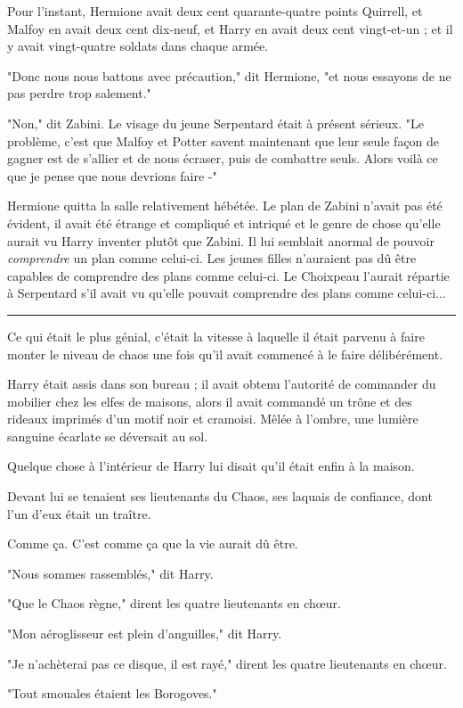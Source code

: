 Pour l'instant, Hermione avait deux cent quarante-quatre points Quirrell, et Malfoy en avait deux cent dix-neuf, et Harry en avait deux cent vingt-et-un ; et il y avait vingt-quatre soldats dans chaque armée.

"Donc nous nous battons avec précaution," dit Hermione, "et nous essayons de ne pas perdre trop salement."

"Non," dit Zabini. Le visage du jeune Serpentard était à présent sérieux. "Le problème, c'est que Malfoy et Potter savent maintenant que leur seule façon de gagner est de s'allier et de nous écraser, puis de combattre seuls. Alors voilà ce que je pense que nous devrions faire -"

Hermione quitta la salle relativement hébétée. Le plan de Zabini n'avait pas été évident, il avait été étrange et compliqué et intriqué et le genre de chose qu'elle aurait vu Harry inventer plutôt que Zabini. Il lui semblait anormal de pouvoir \emph{comprendre } un plan comme celui-ci. Les jeunes filles n'auraient pas dû être capables de comprendre des plans comme celui-ci. Le Choixpeau l'aurait répartie à Serpentard s'il avait vu qu'elle pouvait comprendre des plans comme celui-ci...
\par\noindent\rule{\textwidth}{0.4pt}
Ce qui était le plus génial, c'était la vitesse à laquelle il était parvenu à faire monter le niveau de chaos une fois qu'il avait commencé à le faire délibérément.

Harry était assis dans son bureau ; il avait obtenu l'autorité de commander du mobilier chez les elfes de maisons, alors il avait commandé un trône et des rideaux imprimés d'un motif noir et cramoisi. Mêlée à l'ombre, une lumière sanguine écarlate se déversait au sol.

Quelque chose à l'intérieur de Harry lui disait qu'il était enfin à la maison.

Devant lui se tenaient ses lieutenants du Chaos, ses laquais de confiance, dont l'un d'eux était un traître.

Comme ça. C'est comme ça que la vie aurait dû être.

"Nous sommes rassemblés," dit Harry.

"Que le Chaos règne," dirent les quatre lieutenants en chœur.

"Mon aéroglisseur est plein d'anguilles," dit Harry.

"Je n'achèterai pas ce disque, il est rayé," dirent les quatre lieutenants en chœur.

"Tout smouales étaient les Borogoves."

